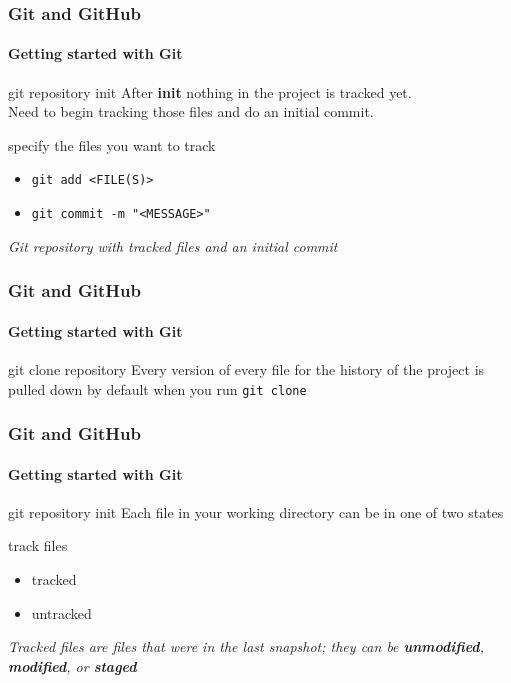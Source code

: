 \begin{frame}
    \frametitle{Git and GitHub}
    \framesubtitle{Getting started with Git}
    \addtocounter{nframe}{1}
	
	\begin{block}{git repository init}
		After \textbf{init} nothing in the project is tracked yet.\\
		Need to begin tracking those files and do an initial commit.
	\end{block}

	\begin{block}{specify the files you want to track}
		\begin{itemize}
			\item \texttt{git add <FILE(S)>}
			\item \texttt{git commit -m "<MESSAGE>"}
		\end{itemize}
	\end{block}
	
	\textit{Git repository with tracked files and an initial commit}
    
\end{frame}

\begin{frame}
    \frametitle{Git and GitHub}
    \framesubtitle{Getting started with Git}
    \addtocounter{nframe}{1}
	
	\begin{block}{git clone repository}
		Every version of every file for the history of the project is pulled down by default when you run \texttt{git clone}
    \end{block}

\end{frame}

\begin{frame}
    \frametitle{Git and GitHub}
    \framesubtitle{Getting started with Git}
    \addtocounter{nframe}{1}
	
	\begin{block}{git repository init}
		Each file in your working directory can be in one of two states
	\end{block}

	\begin{block}{track files}
		\begin{itemize}
			\item tracked
			\item untracked
		\end{itemize}
	\end{block}
	
	\textit{Tracked files are files that were in the last snapshot; they can be \textbf{unmodified}, \textbf{modified}, or \textbf{staged}}
    
\end{frame}


